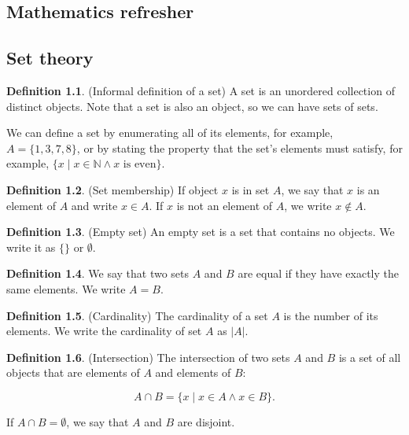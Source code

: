 \documentclass{book}
\theoremstyle{plain}%
\theoremstyle{definition}
\newtheorem{definition}{Definition}[section]
\begin{document}
\begin{appendices}

\chapter{Mathematics refresher}

\section{Set theory}

\begin{definition}(Informal definition of a set) A set is an unordered collection of distinct objects. Note that a set is also an object, so we can have sets of sets.
\end{definition}

We can define a set by enumerating all of its elements, for example, $A = \{1,3,7,8\}$, or by stating the property that the set's elements must satisfy, for example, $\{x \mid x \in \mathbb{N} \wedge \text{$x$ is even}\}$.

\begin{definition}(Set membership) If object $x$ is in set $A$, we say that $x$ is an element of $A$ and write $x \in A$. If $x$ is not an element of $A$, we write $x \notin A$.
\end{definition}

\begin{definition}(Empty set) An empty set is a set that contains no objects. We write it as $\{\}$ or $\emptyset$.
\end{definition}

\begin{definition} We say that two sets $A$ and $B$ are equal if they have exactly the same elements. We write $A = B$.
\end{definition}

\begin{definition}(Cardinality) The cardinality of a set $A$ is the number of its elements. We write the cardinality of set $A$ as $|A|$.
\end{definition}

\begin{definition}(Intersection) The intersection of two sets $A$ and $B$ is a set of all objects that are elements of $A$ and elements of $B$:

$$A \cap B = \{x \mid x \in A \wedge x \in B\}.$$

If $A \cap B = \emptyset$, we say that $A$ and $B$ are disjoint.
\end{definition}


\end{appendices}
\end{document}
